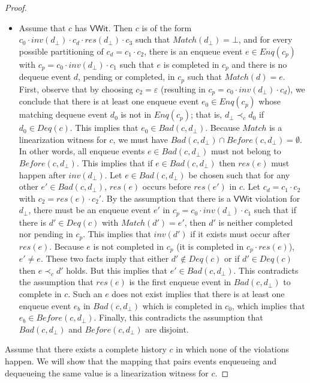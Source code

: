 \documentclass{LMCS}
\newcommand{\Match}{\ensuremath{\mathit{Match}}}
\newcommand{\Deq}[1]{\ensuremath{\mathit{Deq}({#1})}}
\newcommand{\Enq}[1]{\ensuremath{\mathit{Enq}({#1})}}
\newcommand{\Before}[2]{\ensuremath{\mathit{Before}({#1},{#2})}}
\newcommand{\Bad}[2]{\ensuremath{\mathit{Bad}(#1,#2)}}
\newcommand{\dhat}{\ensuremath{d_{\bot}}}
\newcommand{\VWit}{\ensuremath{\mathsf{VWit}}}
\begin{document}
\begin{proof}
\begin{itemize}
\item Assume that $c$ has \VWit.
Then $c$ is of the form $c_0\cdot inv(\dhat)\cdot c_d\cdot res(\dhat)\cdot c_3$ such that $\Match (\dhat)=\bot$, and for every possible partitioning of $c_d=c_1\cdot c_2$, there is an enqueue event $e\in \Enq {c_p}$ with $c_p=c_0\cdot inv(\dhat)\cdot c_1$ such that $e$ is completed in $c_p$ and there is no dequeue event $d$, pending or completed, in $c_p$ such that $\Match(d)=e$.
First, observe that by choosing $c_2=\varepsilon$ (resulting in $c_p=c_0\cdot inv(\dhat)\cdot c_d$), we conclude that there is at least one enqueue event $e_0\in \Enq {c_p}$ whose matching dequeue event $d_0$ is not in $\Enq {c_p}$; that is, $\dhat\prec_c d_0$ if $d_0\in \Deq c$.
This implies that $e_0\in \Bad c {\dhat}$.
Because $\Match$ is a linearization witness for $c$, we must have $\Bad c {\dhat}\cap \Before c {\dhat}=\emptyset$.
In other words, all enqueue events $e\in \Bad c {\dhat}$ must not belong to $\Before c {\dhat}$.
This implies that if $e\in \Bad c {\dhat}$ then $res(e)$ must happen after $inv(\dhat)$.
Let $e\in \Bad c {\dhat}$ be chosen such that for any other $e'\in \Bad c {\dhat}$, $res(e)$ occurs before $res(e')$ in $c$.
Let $c_d=c_1\cdot c_2$ with $c_2=res(e)\cdot c_2'$. 
By the assumption that there is a $\VWit$ violation for $\dhat$, there must be an enqueue event $e'$ in $c_p=c_0\cdot inv(\dhat)\cdot c_1$ such that if there is $d'\in \Deq c$ with $\Match(d')=e'$, then $d'$ is neither completed nor pending in $c_p$.
This implies that $inv(d')$ if it exists must occur after $res(e)$.
Because $e$ is not completed in $c_p$ (it is completed in $c_p\cdot res(e)$), $e'\neq e$.
These two facts imply that either $d'\notin \Deq c$ or if $d'\in \Deq c$ then $e\prec_c d'$ holds.
But this implies that $e'\in \Bad c {\dhat}$.
This contradicts the assumption that $res(e)$ is the first enqueue event in $\Bad c {\dhat}$ to complete in $c$.
Such an $e$ does not exist implies that there is at least one enqueue event $e_b$ in $\Bad c {\dhat}$ which is completed in $c_0$, which implies that $e_b\in \Before c {\dhat}$. 
Finally, this contradicts the assumption that $\Bad c {\dhat}$ and $\Before c {\dhat}$ are disjoint.
\end{itemize}




\noindent{\bf($\Leftarrow$)} 
Assume that there exists a complete history $c$ in which none of the violations happen.
We will show that the mapping that pairs events enqueueing and dequeueing the same value is a linearization witness for $c$.


\end{proof}
\end{document}
